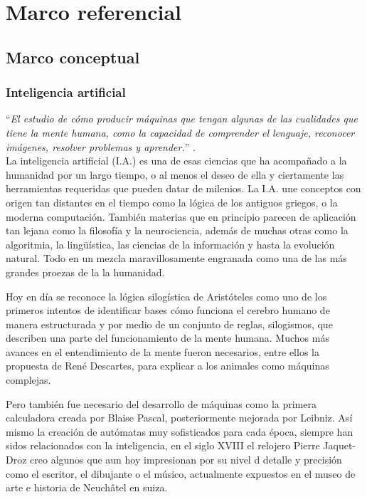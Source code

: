 \chapter{Marco referencial}
\label{chap:FrameworkOfReference}

\section{Marco conceptual}
\label{Sec:FrameConcepts}

    \subsection{Inteligencia artificial}
    \label{sub:FrameAI}
    
        ``\textit{El estudio de cómo producir máquinas que tengan algunas de las cualidades que tiene la mente humana, como la capacidad de comprender el lenguaje, reconocer imágenes, resolver problemas y aprender.}'' \cite{CambridgeDicAI}. \\ 
    
        La inteligencia artificial (I.A.) es una de esas ciencias que ha acompañado a la humanidad por un largo tiempo, o al menos el deseo de ella y ciertamente las herramientas requeridas que pueden datar de milenios. La I.A. une conceptos con origen tan distantes en el tiempo como la lógica de los antiguos griegos, o la moderna computación. También materias que en principio parecen de aplicación tan lejana como la filosofía y la neurociencia, además de muchas otras como la algoritmia, la lingüística, las ciencias de la información y hasta la evolución natural. Todo en un mezcla maravillosamente engranada como una de las más grandes proezas de la la humanidad.
        
        Hoy en día se reconoce la lógica silogística de Aristóteles como uno de los primeros intentos de identificar bases cómo funciona el cerebro humano de manera estructurada y por medio de un conjunto de reglas, silogismos, que describen una parte del funcionamiento de la mente humana. Muchos más avances en el entendimiento de la mente fueron necesarios, entre ellos la propuesta de René Descartes, para explicar a los animales como máquinas complejas. 
        
        Pero también fue necesario del desarrollo de máquinas como la primera calculadora creada por Blaise Pascal, posteriormente mejorada por Leibniz. Así mismo la creación de autómatas muy sofisticados para cada época, siempre han sidos relacionados con la inteligencia, en el siglo XVIII el relojero Pierre Jaquet-Droz creo algunos que aun hoy impresionan por su nivel d detalle y precisión como el escritor, el dibujante o el músico, actualmente expuestos en el museo de arte e historia de Neuchâtel en suiza.
        
